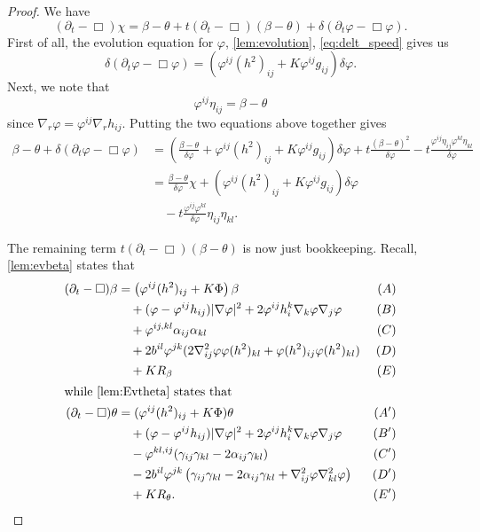\documentclass{amsart}
\begin{document}
\begin{proof}
We have
\[
(\partial_t - \Box)\chi = \beta - \theta + t(\partial_{t} - \Box)(\beta - \theta) + \delta(\partial_t \varphi - \Box\varphi).
\]
First of all, the evolution equation for \(\varphi\), \cref{lem:evolution}, \cref{eq:delt_speed} gives us
\[
\delta(\partial_t \varphi - \Box\varphi) = \left(\varphi^{ij}(h^2)_{ij} + K\varphi^{ij}g_{ij}\right)\delta\varphi.
\]
Next, we note that
\[
\varphi^{ij} \eta_{ij} = \beta - \theta
\]
since \(\nabla_r \varphi = \varphi^{ij} \nabla_r h_{ij}\). Putting the two equations above together gives
\begin{equation}
\label{eq:deltchi1}
\begin{split}
\beta - \theta + \delta(\partial_t \varphi - \Box\varphi) &= \left(\frac{\beta-\theta}{\delta\varphi} + \varphi^{ij}(h^2)_{ij} + K\varphi^{ij}g_{ij}\right)\delta\varphi + t \frac{(\beta - \theta)^2}{\delta\varphi} - t \frac{\varphi^{ij}\eta_{ij} \varphi^{kl}\eta_{kl}}{\delta\varphi} \\
&= \frac{\beta-\theta}{\delta\varphi} \chi + \left(\varphi^{ij}(h^2)_{ij} + K\varphi^{ij}g_{ij}\right)\delta\varphi \\
&\quad - t \frac{\varphi^{ij}\varphi^{kl}}{\delta\varphi} \eta_{ij}\eta_{kl}.
\end{split}
\end{equation}

The remaining term \(t(\partial_{t} - \Box)(\beta - \theta)\) is now just bookkeeping. Recall, \cref{lem:evbeta} states that
\begin{align*}
(\partial_{t} - \Box)\beta &= \left(\varphi^{ij}(h^2)_{ij} + K\Phi \right)\beta  & (A) \\
&\quad + (\varphi - \varphi^{ij}h_{ij}) |\nabla\varphi|^{2} + 2\varphi^{ij}h^{k}_{i}\nabla_k \varphi \nabla_j \varphi  & (B) \\
&\quad + \varphi^{ij,kl} \alpha_{ij} \alpha_{kl} & (C) \\
&\quad + 2b^{il}\varphi^{jk} (2\nabla^2_{ij}\varphi\varphi(h^2)_{kl} + \varphi(h^2)_{ij}\varphi(h^2)_{kl}) & (D) \\
&\quad + KR_{\beta}  & (E) \\
\intertext{while \cref{lem:Evtheta} states that}
(\partial_{t} - \Box)\theta &= (\varphi^{ij}(h^2)_{ij} + K\Phi)\theta & (A') \\
&\quad + (\varphi - \varphi^{ij}h_{ij})|\nabla\varphi|^{2} + 2\varphi^{ij}h^{k}_{i}\nabla_k\varphi\nabla_j\varphi & (B') \\
&\quad - \varphi^{kl,ij} (\gamma_{ij}\gamma_{kl}  - 2\alpha_{ij} \gamma_{kl}) & (C') \\
&\quad - 2b^{il} \varphi^{jk} \left(\gamma_{ij} \gamma_{kl} - 2\alpha_{ij} \gamma_{kl} + \nabla^2_{ij}\varphi\nabla^2_{kl}\varphi\right) & (D') \\
&\quad + KR_{\theta}. & (E')
\end{align*}


\end{proof}
\end{document}
